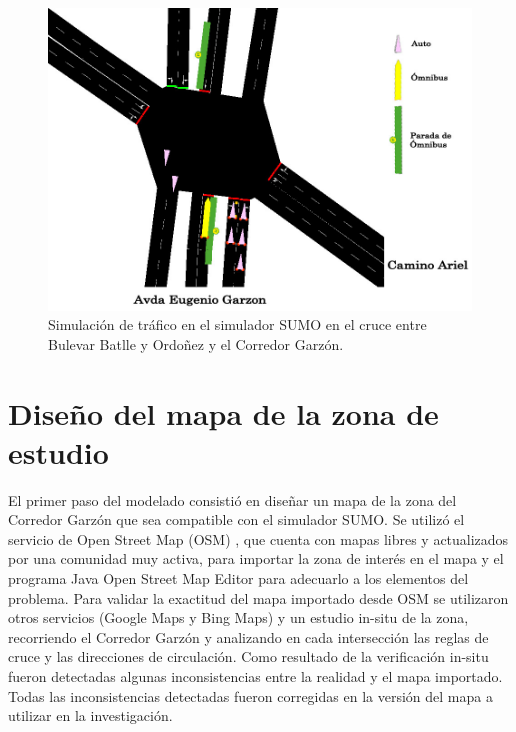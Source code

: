 \begin{figure}[ht]
	\centering
	\includegraphics[width=0.9\linewidth]{Figures/sim1}
	\caption[Simulación de trafico en el simulador SUMO.]{Simulación de tráfico en el simulador SUMO en el cruce entre Bulevar Batlle y Ordoñez y el Corredor Garzón.}
	\label{fig:sim1}
\end{figure}





\section{Diseño del mapa de la zona de estudio}

El primer paso del modelado consistió en diseñar un mapa de la zona del Corredor Garzón que sea compatible con el simulador SUMO. Se utilizó el servicio de Open Street Map (OSM) \citep{OSM}, que cuenta con mapas libres y actualizados por una comunidad muy activa, para importar la zona de interés en el mapa y el programa Java Open Street Map Editor para adecuarlo a los elementos del problema. Para validar la exactitud del mapa importado desde OSM se utilizaron otros servicios (Google Maps y Bing Maps) y un estudio in-situ de la zona, recorriendo el Corredor Garzón y analizando en cada intersección las reglas de cruce y las direcciones de circulación. Como resultado de la verificación in-situ fueron detectadas algunas inconsistencias entre la realidad y el mapa importado. Todas las inconsistencias detectadas fueron corregidas en la versión del mapa a utilizar en la investigación. 

